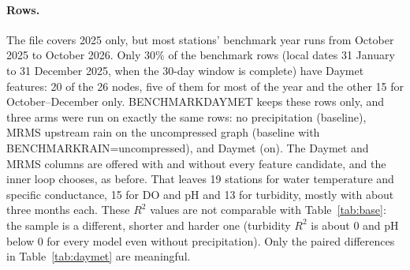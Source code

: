 \documentclass[11pt]{article}
\newcommand{\codeus}{\textunderscore\allowbreak}
\newcommand{\code}[1]{{\ttfamily\let\_\codeus #1}}
\begin{document}
\paragraph{Rows.} The file covers 2025 only, but most stations' benchmark year runs from October 2025
to October 2026. Only $30\%$ of the benchmark rows (local dates 31 January to 31 December 2025, when
the 30-day window is complete) have Daymet features: 20 of the 26 nodes, five of them for most of
the year and the other 15 for October--December only. \code{BENCHMARK\_DAYMET} keeps these rows
only, and three arms were run on exactly the same rows: no precipitation (\code{baseline}), MRMS
upstream rain on the uncompressed graph (\code{baseline} with \code{BENCHMARK\_RAIN=uncompressed}),
and Daymet (\code{on}). The Daymet and MRMS columns are offered with and without every feature
candidate, and the inner loop chooses, as before. That leaves 19 stations for water temperature and
specific conductance, 15 for DO and pH and 13 for turbidity, mostly with about three months each.
These $R^2$ values are not comparable with Table~\ref{tab:base}: the sample is a different, shorter
and harder one (turbidity $R^2$ is about $0$ and pH below $0$ for every model even without
precipitation). Only the paired differences in Table~\ref{tab:daymet} are meaningful.
\end{document}
